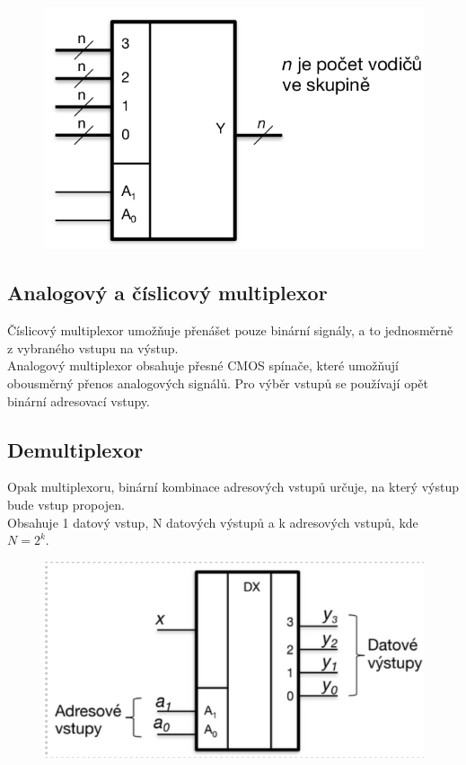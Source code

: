 \begin{figure}[h!]
    \centering
    \includegraphics[scale = 0.3]{img/SkupMux.png}
\end{figure}

\subsection{Analogový a číslicový multiplexor}
Číslicový multiplexor umožňuje přenášet pouze binární signály, a to jednosměrně z vybraného vstupu na výstup. \\
Analogový multiplexor obsahuje přesné CMOS spínače, které umožňují obousměrný přenos analogových signálů. Pro výběr vstupů se používají opět binární adresovací vstupy.\\

\subsection{Demultiplexor}
Opak multiplexoru, binární kombinace adresových vstupů určuje, na který výstup bude vstup propojen. \\
Obsahuje 1 datový vstup, N datových výstupů a k adresových vstupů, kde \(N = 2^k\).\\

\begin{figure}[h!]
    \centering
    \includegraphics[scale = 0.3]{img/demux.png}
\end{figure}

